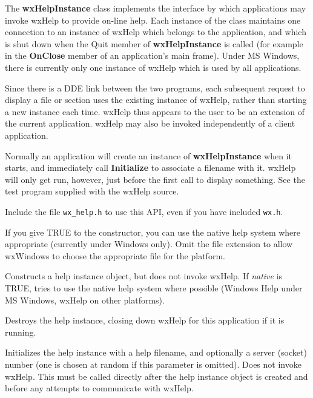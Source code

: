 The {\bf wxHelpInstance} class implements the interface by which
applications may invoke wxHelp to provide on-line help. Each instance
of the class maintains one connection to an instance of wxHelp which
belongs to the application, and which is shut down when the Quit
member of {\bf wxHelpInstance} is called (for example in the {\bf
OnClose} member of an application's main frame). Under MS Windows,
there is currently only one instance of wxHelp which is used by all
applications.

Since there is a DDE link between the two programs, each subsequent
request to display a file or section uses the existing instance of
wxHelp, rather than starting a new instance each time. wxHelp thus
appears to the user to be an extension of the current application.
wxHelp may also be invoked independently of a client application.

Normally an application will create an instance of {\bf
wxHelpInstance} when it starts, and immediately call {\bf Initialize}\rtfsp
to associate a filename with it. wxHelp will only get run, however,
just before the first call to display something. See the test program
supplied with the wxHelp source.

Include the file {\tt wx\_help.h} to use this API, even if you have
included {\tt wx.h}.

If you give TRUE to the constructor, you can use the native help system
where appropriate (currently under Windows only). Omit the file extension
to allow wxWindows to choose the appropriate file for the platform.



Constructs a help instance object, but does not invoke wxHelp.
If {\it native} is TRUE, tries to use the native help system where
possible (Windows Help under MS Windows, wxHelp on other platforms).


Destroys the help instance, closing down wxHelp for this application
if it is running.



Initializes the help instance with a help filename, and optionally a server (socket)
number (one is chosen at random if this parameter is omitted). Does not invoke wxHelp.
This must be called directly after the help instance object is created and before
any attempts to communicate with wxHelp.

